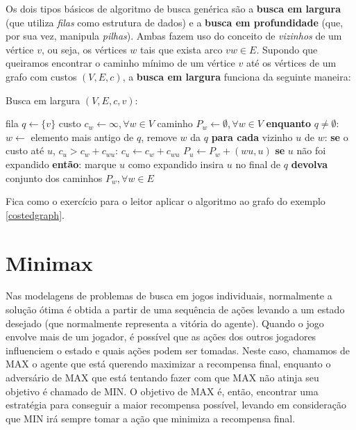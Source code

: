 Os dois tipos básicos de algoritmo de busca genérica são a \textbf{busca em largura} (que utiliza \textit{filas} como estrutura de dados) e a \textbf{busca em profundidade} (que, por sua vez, manipula \textit{pilhas}). Ambas fazem uso do conceito de \textit{vizinhos} de um vértice $v$, ou seja, os vértices $w$ tais que exista arco $vw \in E$. Supondo que queiramos encontrar o caminho mínimo de um vértice $v$ até os vértices de um grafo com custos $(V, E, c)$, a \textbf{busca em largura} funciona da seguinte maneira:

\begin{algorithm}
  \caption*{Busca em largura $(V, E, c, v)$:}
  \begin{algorithmic}
    \STATE fila $q \gets \{v\}$
    \STATE custo $c_w \gets \infty, \forall w \in V$
    \STATE caminho $P_w \gets \emptyset, \forall w \in V$
    \STATE \textbf{enquanto} $q \neq \emptyset$:
    \STATE \ind $w \gets $ elemento mais antigo de $q$, remove $w$ da $q$
    \STATE \ind \textbf{para cada} vizinho $u$ de $w$:
    \STATE \ind \ind \textbf{se } o custo até $u$, $c_u > c_w + c_{wu}$:
    \STATE \ind \ind \ind $c_u \gets c_w + c_{wu}$
    \STATE \ind \ind \ind $P_u \gets P_w + (wu, u)$
    \STATE \ind \ind \textbf{se} $u$ não foi expandido \textbf{ então}:
    \STATE \ind \ind \ind marque $u$ como expandido
    \STATE \ind \ind \ind insira $u$ no final de $q$
    \STATE \textbf{devolva} conjunto dos caminhos $P_w, \forall w \in E$
  \end{algorithmic}
\end{algorithm}

Fica como o exercício para o leitor aplicar o algoritmo ao grafo do exemplo \ref{costedgraph}.

\section{Minimax}
Nas modelagens de problemas de busca em jogos individuais, normalmente a solução ótima é obtida a partir de uma sequência de ações levando a um estado desejado (que normalmente representa a vitória do agente). Quando o jogo envolve mais de um jogador, é possível que as ações dos outros jogadores influenciem o estado e quais ações podem ser tomadas. Neste caso, chamamos de MAX o agente que está querendo maximizar a recompensa final, enquanto o adversário de MAX que está tentando fazer com que MAX não atinja seu objetivo é chamado de MIN. O objetivo de MAX é, então, encontrar uma estratégia para conseguir a maior recompensa possível, levando em consideração que MIN irá sempre tomar a ação que minimiza a recompensa final.

